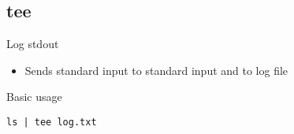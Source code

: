 \subsection{tee}

\begin{frame}[fragile]{Log stdout}
  \begin{itemize}
    \pause \item Sends standard input to standard input and to log file
  \end{itemize}
  \begin{exampleblock}{Basic usage}
    \begin{lstlisting}[showstringspaces=false,basicstyle=\tiny]
ls | tee log.txt
    \end{lstlisting}
  \end{exampleblock}
\end{frame}



